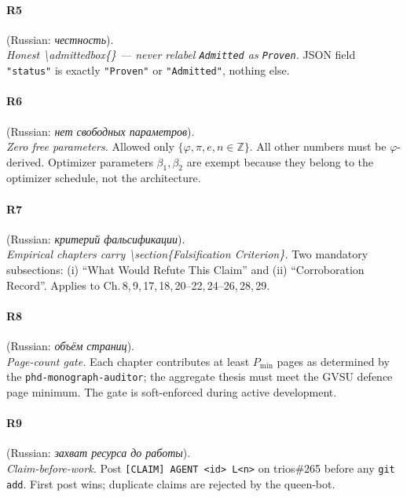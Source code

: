 \paragraph*{\textmd{\textbf{R5}}}
\label{entry:r5}
(Russian: \textit{честность}).\\
\emph{Honest \textbackslash admittedbox\{\} — never relabel \texttt{Admitted} as \texttt{Proven}.}
JSON field \texttt{"status"} is exactly \texttt{"Proven"} or
\texttt{"Admitted"}, nothing else.

\paragraph*{\textmd{\textbf{R6}}}
\label{entry:r6}
(Russian: \textit{нет свободных параметров}).\\
\emph{Zero free parameters.}
Allowed only $\{\varphi, \pi, e, n \in \mathbb{Z}\}$.
All other numbers must be $\varphi$-derived.
Optimizer parameters $\beta_1, \beta_2$ are exempt because they
belong to the optimizer schedule, not the architecture.

\paragraph*{\textmd{\textbf{R7}}}
\label{entry:r7}
(Russian: \textit{критерий фальсификации}).\\
\emph{Empirical chapters carry \textbackslash section\{Falsification Criterion\}.}
Two mandatory subsections: (i) ``What Would Refute This Claim'' and
(ii) ``Corroboration Record''.
Applies to Ch.\,8,\,9,\,17,\,18,\,20–22,\,24–26,\,28,\,29.

\paragraph*{\textmd{\textbf{R8}}}
\label{entry:r8}
(Russian: \textit{объём страниц}).\\
\emph{Page-count gate.}
Each chapter contributes at least $P_{\min}$ pages as determined by
the \texttt{phd-monograph-auditor}; the aggregate thesis must meet
the GVSU defence page minimum.
The gate is soft-enforced during active development.

\paragraph*{\textmd{\textbf{R9}}}
\label{entry:r9}
(Russian: \textit{захват ресурса до работы}).\\
\emph{Claim-before-work.}
Post \texttt{[CLAIM] AGENT <id> L<n>} on trios\#265
before any \texttt{git add}.
First post wins; duplicate claims are rejected by the queen-bot.

